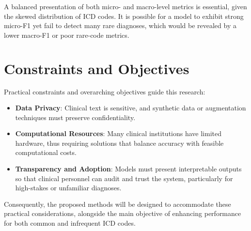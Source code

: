 A balanced presentation of both micro- and macro-level metrics is essential, given the skewed distribution of ICD codes. It is possible for a model to exhibit strong micro-F1 yet fail to detect many rare diagnoses, which would be revealed by a lower macro-F1 or poor rare-code metrics.

\section{Constraints and Objectives}
Practical constraints and overarching objectives guide this research:

\begin{itemize}
    \item \textbf{Data Privacy}: Clinical text is sensitive, and synthetic data or augmentation techniques must preserve confidentiality.
    \item \textbf{Computational Resources}: Many clinical institutions have limited hardware, thus requiring solutions that balance accuracy with feasible computational costs.
    \item \textbf{Transparency and Adoption}: Models must present interpretable outputs so that clinical personnel can audit and trust the system, particularly for high-stakes or unfamiliar diagnoses.
\end{itemize}

Consequently, the proposed methods will be designed to accommodate these practical considerations, alongside the main objective of enhancing performance for both common and infrequent ICD codes.
